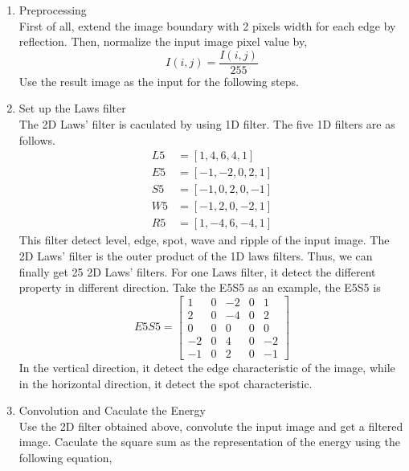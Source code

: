 \documentclass[11pt]{article}
\begin{document}
\begin{enumerate}
\item Preprocessing\\
First of all, extend the image boundary with 2 pixels width for each edge by reflection. Then, normalize the input image pixel value by,
\begin{equation}
I(i,j)= \frac { I(i,j) }{ 255 } 
\end{equation}
Use the result image as the input for the following steps.\par

\item Set up the Laws filter \\
The 2D Laws' filter is caculated by using 1D filter. The five 1D filters are as follows.
\begin{equation}
\begin{aligned}
L5&=[1,4,6,4,1]\\
E5&=[-1,-2,0,2,1]\\
S5&=[-1,0,2,0,-1]\\
W5&=[-1,2,0,-2,1]\\
R5&=[ 1,-4,6,-4,1]
\end{aligned}
\end{equation}
This filter detect level, edge, spot, wave and ripple of the input image.
The 2D Laws' filter is the outer product of the 1D laws filters. Thus, we can finally get 25 2D Laws' filters. For one Laws filter, it detect the different property in different direction. Take the E5S5 as an example, the E5S5 is  
\begin{equation}
E5S5=\begin{bmatrix} 1 & 0 & -2 & 0 & 1 \\ 2 & 0 & -4 & 0 & 2 \\ 0 & 0 & 0 & 0 & 0 \\ -2 & 0 & 4 & 0 & -2 \\ -1 & 0 & 2 & 0 & -1 \end{bmatrix}
\end{equation}
In the vertical direction, it detect the edge characteristic of the image, while in the horizontal direction, it detect the spot characteristic.\par
\item Convolution and Caculate the Energy\\
Use the 2D filter obtained above, convolute the input image and get a filtered image. Caculate the square sum as the representation of the energy using the following equation,


\end{enumerate}
\end{document}
